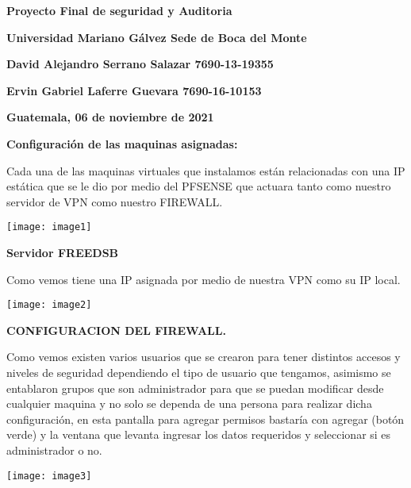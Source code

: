 \documentclass{article} %
\begin{document}


\noindent \textbf{Proyecto Final de seguridad y Auditoria}

\noindent \textbf{Universidad Mariano G\'{a}lvez Sede de Boca del Monte}

\noindent \textbf{David Alejandro Serrano Salazar 7690-13-19355}

\noindent \textbf{Ervin Gabriel Laferre Guevara 7690-16-10153}

\noindent \textbf{Guatemala, 06 de noviembre de 2021}

\noindent \textbf{}

\noindent \textbf{}

\noindent \textbf{Configuraci\'{o}n de las maquinas asignadas:}

\noindent 

\noindent Cada una de las maquinas virtuales que instalamos est\'{a}n relacionadas con una IP est\'{a}tica que se le dio por medio del PFSENSE que actuara tanto como nuestro servidor de VPN como nuestro FIREWALL.

\noindent 

\noindent \texttt{[image: image1]}

\noindent \textbf{Servidor FREEDSB}

\noindent Como vemos tiene una IP asignada por medio de nuestra VPN como su IP local.

\noindent 

\noindent \texttt{[image: image2]}

\noindent 

\noindent \textbf{CONFIGURACION DEL FIREWALL.}

\noindent Como vemos existen varios usuarios que se crearon para tener distintos accesos y niveles de seguridad dependiendo el tipo de usuario que tengamos, asimismo se entablaron grupos que son administrador para que se puedan modificar desde cualquier maquina y no solo se dependa de una persona para realizar dicha configuraci\'{o}n, en esta pantalla para agregar permisos bastar\'{i}a con agregar (bot\'{o}n verde) y la ventana que levanta ingresar los datos requeridos y seleccionar si es administrador o no.

\noindent 

\noindent \texttt{[image: image3]}

\noindent 
\end{document}
